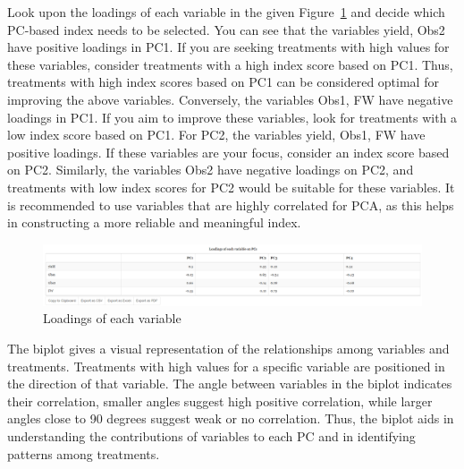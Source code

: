\documentclass[
  letterpaper,
  DIV=11,
  numbers=noendperiod]{scrartcl}
\begin{document}
Look upon the loadings of each variable in the given
Figure~\ref{fig-loadings} and decide which PC-based index needs to be
selected. You can see that the variables yield, Obs2 have positive
loadings in PC1. If you are seeking treatments with high values for
these variables, consider treatments with a high index score based on
PC1. Thus, treatments with high index scores based on PC1 can be
considered optimal for improving the above variables. Conversely, the
variables Obs1, FW have negative loadings in PC1. If you aim to improve
these variables, look for treatments with a low index score based on
PC1. For PC2, the variables yield, Obs1, FW have positive loadings. If
these variables are your focus, consider an index score based on PC2.
Similarly, the variables Obs2 have negative loadings on PC2, and
treatments with low index scores for PC2 would be suitable for these
variables. It is recommended to use variables that are highly correlated
for PCA, as this helps in constructing a more reliable and meaningful
index.

\begin{figure}

{\centering \includegraphics{MAN4.webp}

}

\caption{\label{fig-loadings}Loadings of each variable}

\end{figure}

The biplot gives a visual representation of the relationships among
variables and treatments. Treatments with high values for a specific
variable are positioned in the direction of that variable. The angle
between variables in the biplot indicates their correlation, smaller
angles suggest high positive correlation, while larger angles close to
90 degrees suggest weak or no correlation. Thus, the biplot aids in
understanding the contributions of variables to each PC and in
identifying patterns among treatments.
\end{document}
